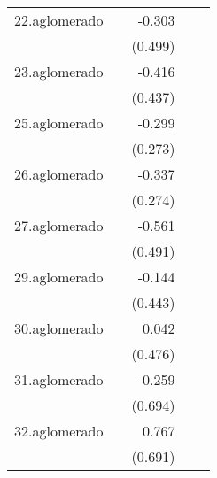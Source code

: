 {\begin{longtable}{l*{4}{D{.}{.}{-1}}}
\addlinespace
22.aglomerado&                     &      -0.303         &                     &                     \\
            &                     &     (0.499)         &                     &                     \\
\addlinespace
23.aglomerado&                     &      -0.416         &                     &                     \\
            &                     &     (0.437)         &                     &                     \\
\addlinespace
25.aglomerado&                     &      -0.299         &                     &                     \\
            &                     &     (0.273)         &                     &                     \\
\addlinespace
26.aglomerado&                     &      -0.337         &                     &                     \\
            &                     &     (0.274)         &                     &                     \\
\addlinespace
27.aglomerado&                     &      -0.561         &                     &                     \\
            &                     &     (0.491)         &                     &                     \\
\addlinespace
29.aglomerado&                     &      -0.144         &                     &                     \\
            &                     &     (0.443)         &                     &                     \\
\addlinespace
30.aglomerado&                     &       0.042         &                     &                     \\
            &                     &     (0.476)         &                     &                     \\
\addlinespace
31.aglomerado&                     &      -0.259         &                     &                     \\
            &                     &     (0.694)         &                     &                     \\
\addlinespace
32.aglomerado&                     &       0.767         &                     &                     \\
            &                     &     (0.691)         &                     &                     \\

\end{longtable}}
